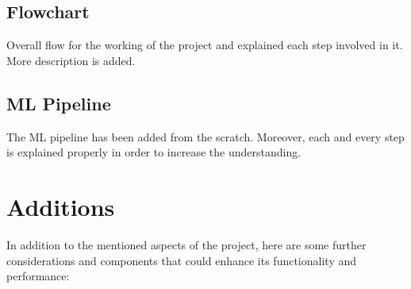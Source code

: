 \subsection*{Flowchart}
Overall flow for the working of the project and explained each step involved in it. More description is added.

\subsection*{ML Pipeline}
The ML pipeline has been added from the scratch. Moreover, each and every step is explained properly in order to increase the understanding.

\section{Additions}


	
	In addition to the mentioned aspects of the project, here are some further considerations and components that could enhance its functionality and performance:
	
